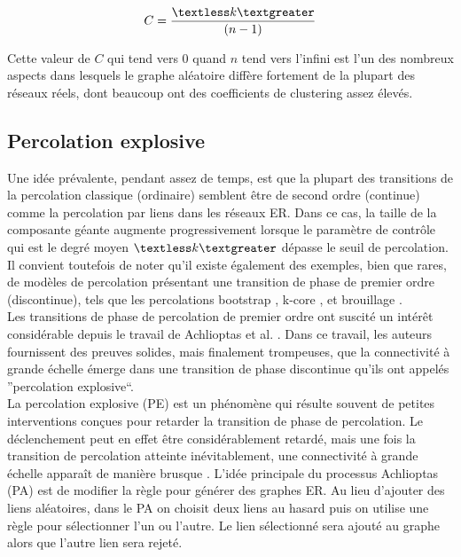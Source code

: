 \begin{equation}
C=\dfrac{\textless k\textgreater}{(n - 1)}
\end{equation}

Cette valeur de $C$ qui tend vers $0$ quand $n$ tend vers l'infini est l'un des nombreux aspects dans lesquels le graphe aléatoire diffère fortement de la plupart des réseaux réels, dont beaucoup ont des coefficients de clustering assez élevés.

\subsection{Percolation explosive}
Une idée prévalente, pendant assez de temps, est que la plupart des transitions de la percolation classique (ordinaire) semblent être de second ordre (continue) comme la percolation par liens dans les réseaux ER. Dans ce cas,  la taille de la composante géante augmente progressivement lorsque le paramètre de contrôle qui est le degré moyen $\km$ dépasse le seuil de percolation. Il convient toutefois de noter qu'il existe également des exemples, bien que rares, de modèles de percolation présentant une transition de phase de premier ordre (discontinue), tels que les percolations bootstrap \cite{Adler1991}, k-core \cite{Dorogovtsev2-2006}, et brouillage \cite{Echenique-al2005}.\\ 
Les transitions de phase de percolation de premier ordre ont suscité un intérêt considérable depuis le travail de Achlioptas et al. \cite{Achlioptas-al2009}. Dans ce travail, les auteurs fournissent des preuves solides, mais finalement trompeuses, que la connectivité à grande échelle émerge dans une transition de phase discontinue qu'ils ont appelés ''percolation explosive``.\\
La percolation explosive (PE) est un phénomène qui résulte souvent de petites interventions conçues pour retarder la transition de phase de percolation. Le déclenchement peut en effet être considérablement retardé, mais une fois la transition de percolation atteinte inévitablement, une connectivité à grande échelle apparaît de manière brusque \cite{Costa-al2010,Costa-al2015,Cho-Kahng2011}.
L'idée principale du processus Achlioptas (PA) \cite{Achlioptas-al2009} est de modifier la règle pour générer des graphes ER. Au lieu d'ajouter des liens aléatoires, dans le PA on choisit deux liens au hasard puis on utilise une règle pour sélectionner l'un ou l'autre. Le lien sélectionné sera ajouté au graphe alors que l'autre lien sera rejeté.\\ 
